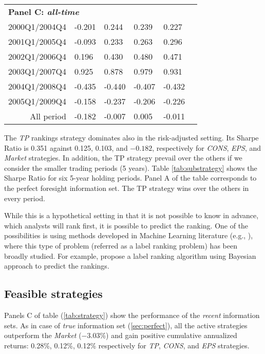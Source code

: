 \documentclass{book}
\newcommand{\tr}{\textit{true}}
\newcommand{\naive}{\textit{recent}}
\newcommand{\default}{\textit{all-time}}
\begin{document}
\begin{table}[hp]
\begin{tabularx}{\linewidth}{r*{5}{Y}}
  \multicolumn{5}{l}{\textbf{Panel C: \default{}}} \\
2000Q1/2004Q4 & -0.201 & 0.244 & 0.239 & 0.227 \\ 
  2001Q1/2005Q4 & -0.093 & 0.233 & 0.263 & 0.296 \\ 
  2002Q1/2006Q4 & 0.196 & 0.430 & 0.480 & 0.471 \\ 
  2003Q1/2007Q4 & 0.925 & 0.878 & 0.979 & 0.931 \\ 
  2004Q1/2008Q4 & -0.435 & -0.440 & -0.407 & -0.432 \\ 
  2005Q1/2009Q4 & -0.158 & -0.237 & -0.206 & -0.226 \\ 
  All period & -0.182 & -0.007 & 0.005 & -0.011 \\ 
  
\bottomrule
\end{tabularx}
\end{table}


The \textit{TP} rankings strategy dominates also in the risk-adjusted setting. Its Sharpe Ratio is 0.351 against 0.125, 0.103, and \ensuremath{-0.182}, respectively for \textit{CONS}, \textit{EPS}, and \textit{Market} strategies. In addition, the TP strategy prevail over the others if we consider the smaller trading periods (5 years). Table \ref{tab:substrategy} shows the Sharpe Ratio for six 5-year holding periods. Panel A of the table corresponds to the perfect foresight information set. The TP strategy wins over the others in every period.

While this is a hypothetical setting in that it is not possible to know in advance, which analysts will rank first, it is possible to predict the ranking. One of the possibilities is using methods developed in Machine Learning literature (e.g., \cite{aiguzhinov2010,brazdil2003}), where this type of problem (referred as a label ranking problem) has been broadly studied. For example, \cite{aiguzhinov2010} propose a label ranking algorithm using Bayesian approach to predict the rankings.



\subsection{Feasible strategies}
Panels C of table (\ref{tab:strategy}) show the performance of the \naive{} information sets. As in case of \tr{} information set (\ref{sec:perfect}), all the active strategies outperform the \textit{Market} (\ensuremath{-3.03}\%)  and gain positive cumulative annualized returns: 0.28\%,  0.12\%, 0.12\% respectively for \textit{TP}, \textit{CONS}, and \textit{EPS} strategies.
\end{document}
